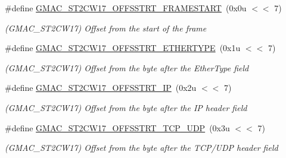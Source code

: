 \begin{DoxyCompactItemize}
\item 
\mbox{\label{group__SAME70__GMAC_ga8cb6fd5d17dc67fb6108755311b9bad4}} 
\#define \mbox{\hyperlink{group__SAME70__GMAC_ga8cb6fd5d17dc67fb6108755311b9bad4}{G\+M\+A\+C\+\_\+\+S\+T2\+C\+W17\+\_\+\+O\+F\+F\+S\+S\+T\+R\+T\+\_\+\+F\+R\+A\+M\+E\+S\+T\+A\+RT}}~(0x0u $<$$<$ 7)
\begin{DoxyCompactList}\small\item\em (G\+M\+A\+C\+\_\+\+S\+T2\+C\+W17) Offset from the start of the frame \end{DoxyCompactList}\item 
\mbox{\label{group__SAME70__GMAC_ga73d161ed3af736b0f89b96c22a4d1090}} 
\#define \mbox{\hyperlink{group__SAME70__GMAC_ga73d161ed3af736b0f89b96c22a4d1090}{G\+M\+A\+C\+\_\+\+S\+T2\+C\+W17\+\_\+\+O\+F\+F\+S\+S\+T\+R\+T\+\_\+\+E\+T\+H\+E\+R\+T\+Y\+PE}}~(0x1u $<$$<$ 7)
\begin{DoxyCompactList}\small\item\em (G\+M\+A\+C\+\_\+\+S\+T2\+C\+W17) Offset from the byte after the Ether\+Type field \end{DoxyCompactList}\item 
\mbox{\label{group__SAME70__GMAC_ga6cd6f8f4a377c9224c0f051b189e8ffe}} 
\#define \mbox{\hyperlink{group__SAME70__GMAC_ga6cd6f8f4a377c9224c0f051b189e8ffe}{G\+M\+A\+C\+\_\+\+S\+T2\+C\+W17\+\_\+\+O\+F\+F\+S\+S\+T\+R\+T\+\_\+\+IP}}~(0x2u $<$$<$ 7)
\begin{DoxyCompactList}\small\item\em (G\+M\+A\+C\+\_\+\+S\+T2\+C\+W17) Offset from the byte after the IP header field \end{DoxyCompactList}\item 
\mbox{\label{group__SAME70__GMAC_gaa1fded62434a9d763c74c4583e0c6324}} 
\#define \mbox{\hyperlink{group__SAME70__GMAC_gaa1fded62434a9d763c74c4583e0c6324}{G\+M\+A\+C\+\_\+\+S\+T2\+C\+W17\+\_\+\+O\+F\+F\+S\+S\+T\+R\+T\+\_\+\+T\+C\+P\+\_\+\+U\+DP}}~(0x3u $<$$<$ 7)
\begin{DoxyCompactList}\small\item\em (G\+M\+A\+C\+\_\+\+S\+T2\+C\+W17) Offset from the byte after the T\+C\+P/\+U\+DP header field \end{DoxyCompactList}\item 
\mbox{\label{group__SAME70__GMAC_ga53502b66ee26584ac3b293d2e93169bf}} 

\end{DoxyCompactItemize}

